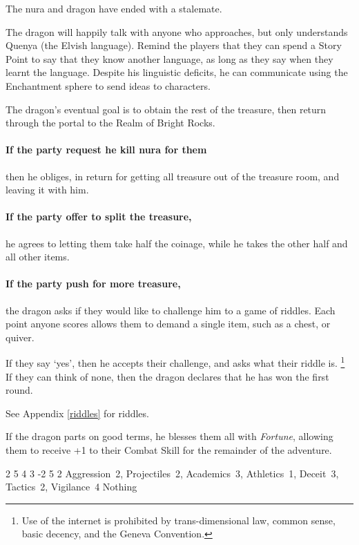 \begin{multicols}{2}
\begin{exampletext}
	The nura and dragon have ended with a stalemate.

\end{exampletext}

The dragon will happily talk with anyone who approaches, but only understands Quenya (the Elvish language).
Remind the players that they can spend a Story Point to say that they know another language, as long as they say when they learnt the language.
Despite his linguistic deficits, he can communicate using the Enchantment sphere to send ideas to characters.

The dragon's eventual goal is to obtain the rest of the treasure, then return through the portal to the Realm of Bright Rocks.

\paragraph{If the party request he kill nura for them}
then he obliges, in return for getting all treasure out of the treasure room, and leaving it with him.
\paragraph{If the party offer to split the treasure,}
he agrees to letting them take half the coinage, while he takes the other half and all other items.
\paragraph{If the party push for more treasure,}
the dragon asks if they would like to challenge him to a game of riddles.
Each point anyone scores allows them to demand a single item, such as a chest, or quiver.

If they say `yes', then he accepts their challenge, and asks what their riddle is.%
\footnote{Use of the internet is prohibited by trans-dimensional law, common sense, basic decency, and the Geneva Convention.}
If they can think of none,
then the dragon declares that he has won the first round.

See Appendix \ref{riddles} for riddles.

If the dragon parts on good terms, he blesses them all with \textit{Fortune}, allowing them to receive +1 to their Combat Skill for the remainder of the adventure.

{2}%
{5}%
{{4}%
{3}%
{-2}}%
{5}%
{2}%
{Aggression~2, Projectiles~2, Academics~3, Athletics~1, Deceit~3, Tactics~2, Vigilance~4}%
{Nothing}%
{}


\end{multicols}
